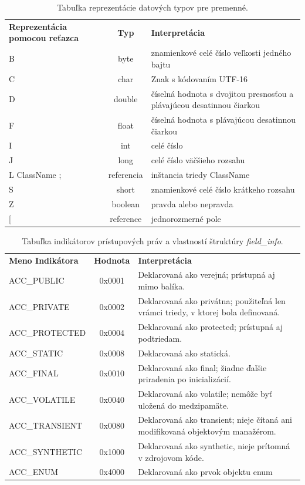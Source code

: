 \documentclass[11pt,final,oneside]{fithesis}
\begin{document}
\begin{table}
  \begin{tabular}{| p{3cm} | c | p{} |}
    \hline
    \textbf{Reprezentácia pomocou reťazca} & \textbf{Typ} & 
    \textbf{Interpretácia} \\
    \hhline{|=|=|=|}
     B & byte &  znamienkové celé číslo veľkosti jedného bajtu \\ \hline
     C & char & Znak s kódovaním UTF-16 \\ \hline
     D & double & číselná hodnota s dvojitou presnosťou a plávajúcou
     desatinnou čiarkou \\ \hline
     F & float & číselná hodnota s plávajúcou desatinnou čiarkou \\ \hline
     I & int & celé číslo \\ \hline
     J & long & celé číslo väčšieho rozsahu \\ \hline
     L ClassName ; & referencia & inštancia triedy ClassName \\ \hline
     S & short & znamienkové celé číslo krátkeho rozsahu \\ \hline
     Z & boolean & pravda alebo nepravda \\ \hline
     [ & reference & jednorozmerné pole \\
    \hline
  \end{tabular}
  \caption{Tabuľka reprezentácie datových typov pre premenné.}
  \label{tab:tab3}
\end{table}

\begin{table}
  \begin{tabular}{| l | c | p{} |}
    \hline
    \textbf{Meno Indikátora} & \textbf{Hodnota} & \textbf{Interpretácia} \\
    \hhline{|=|=|=|}
    ACC\_PUBLIC & 0x0001 & Deklarovaná ako verejná; prístupná aj mimo balíka.
    \\ \hline
    ACC\_PRIVATE & 0x0002 & Deklarovaná ako privátna; použiteľná len vrámci 
    triedy, v ktorej bola definovaná. \\ \hline
    ACC\_PROTECTED & 0x0004 & Deklarovaná ako protected; prístupná aj 
    podtriedam. \\ \hline
    ACC\_STATIC & 0x0008 & Deklarovaná ako statická. \\ \hline
    ACC\_FINAL & 0x0010 & Deklarovaná ako final; žiadne ďalšie priradenia po
    inicializácií. \\ \hline
    ACC\_VOLATILE & 0x0040 & Deklarovaná ako volatile; nemôže byť uložená do
    medzipamäte. \\ \hline
    ACC\_TRANSIENT & 0x0080 & Deklarovaná ako transient; nieje čítaná ani
    modifikovaná objektovým manažérom. \\ \hline
    ACC\_SYNTHETIC & 0x1000 & Deklarovaná ako synthetic, nieje prítomná v
    zdrojovom kóde. \\ \hline
    ACC\_ENUM & 0x4000 & Deklarovaná ako prvok objektu enum \\
    \hline
  \end{tabular}
  \caption{Tabuľka indikátorov prístupových práv a vlastností štruktúry
  \textit {field\_info}.}
  \label{tab:tab4}
\end{table}
\end{document}
